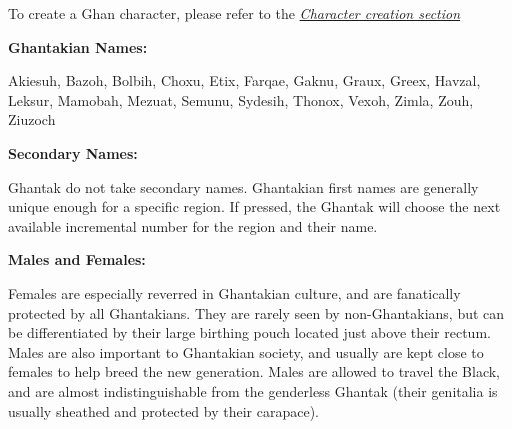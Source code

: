 To create a Ghan character, please refer to the \textit{\hyperref[sec:rules-creation]{Character creation section}}

\textbf{Ghantakian Names:}

Akiesuh, Bazoh, Bolbih, Choxu, Etix, Farqae, Gaknu, Graux, Greex, Havzal, Leksur, Mamobah, Mezuat, Semunu, Sydesih, Thonox, Vexoh, Zimla, Zouh, Ziuzoch

\textbf{Secondary Names:}

Ghantak do not take secondary names. Ghantakian first names are generally unique enough for a specific region. If pressed, the Ghantak will choose the next available incremental number for the region and their name.

\textbf{Males and Females:}

Females are especially reverred in Ghantakian culture, and are fanatically protected by all Ghantakians. They are rarely seen by non-Ghantakians, but can be differentiated by their large birthing pouch located just above their rectum. Males are also important to Ghantakian society, and usually are kept close to females to help breed the new generation. Males are allowed to travel the Black, and are almost indistinguishable from the genderless Ghantak (their genitalia is usually sheathed and protected by their carapace).
